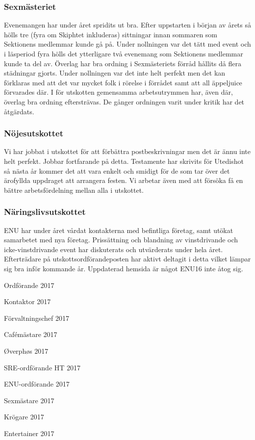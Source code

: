 \documentclass[../_main/handlingar.tex]{subfiles}
\begin{document}
\subsubsection*{Sexmästeriet}
Evenemangen har under året spridits ut bra. Efter uppstarten i början av årets så hölls tre (fyra om Skiphtet inkluderas) sittningar innan sommaren som Sektionens medlemmar kunde gå på. Under nollningen var det tätt med event och i läsperiod fyra hölls det ytterligare två evenemang som Sektionens medlemmar kunde ta del av. Överlag har bra ordning i Sexmästeriets förråd hållits då flera städningar gjorts. Under nollningen var det inte helt perfekt men det kan förklaras med att det var mycket folk i rörelse i förrådet samt att all äppeljuice förvarades där. I för utskotten gemensamma arbetsutrymmen har, även där, överlag bra ordning eftersträvas. De gånger ordningen varit under kritik har det åtgärdats.

\subsubsection*{Nöjesutskottet}
Vi har jobbat i utskottet för att förbättra postbeskrivningar men det är ännu inte helt perfekt. Jobbar fortfarande på detta. Testamente har skrivits för Utedishot så nästa år kommer det att vara enkelt och smidigt för de som tar över det ärofyllda uppdraget att arrangera festen. Vi arbetar även med att försöka få en bättre arbetsfördelning mellan alla i utskottet.


\subsubsection*{Näringslivsutskottet}
ENU har under året vårdat kontakterna med befintliga företag, samt utökat samarbetet med nya företag. Prissättning och blandning av vinstdrivande och icke-vinstdrivande event har diskuterats och utvärderats under hela året. Efterträdare på utskottsordförandeposten har aktivt deltagit i detta vilket lämpar sig bra inför kommande år. Uppdaterad hemsida är något ENU16 inte åtog sig.

\newpage
\begin{signatures}{10}
    \mvh
    \signature{Erik Månsson}{Ordförande 2017}
    \signature{Johan Karlberg}{Kontaktor 2017}
    \signature{Sophia Grimmei{\ss} Grahm}{Förvaltningschef 2017}
    \signature{Daniel Bakic}{Cafémästare 2017}
    \signature{Niklas Gustafson}{Øverphøs 2017}
    \signature{Edvard Carlsson}{SRE-ordförande HT 2017}
    \signature{Josefine Sandström}{ENU-ordförande 2017}
    \signature{Linnea Sjödahl}{Sexmästare 2017}
    \signature{Markus Rahne}{Krögare 2017}
    \signature{Albin Nyström Eklund}{Entertainer 2017}
\end{signatures}
\end{document}

